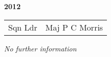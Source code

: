 \begin{center}
  \Huge
  \textbf{2012}
\end{center}

\begin{center}
  \small
  \begin{tabular}{rl}
    Sqn Ldr & Maj P C Morris \\
  \end{tabular}
\end{center}

\begin{center}
  \textit{No further information}
\end{center}

\vspace{50mm}

\pagebreak
